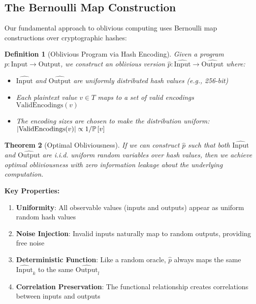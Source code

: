 \documentclass[11pt,final]{article}
\newtheorem{theorem}{Theorem}[section]
\newtheorem{definition}[theorem]{Definition}
\begin{document}
\subsection{The Bernoulli Map Construction}

Our fundamental approach to oblivious computing uses Bernoulli map constructions over cryptographic hashes:

\begin{definition}[Oblivious Program via Hash Encoding]
Given a program $p: \text{Input} \to \text{Output}$, we construct an oblivious version $\hat{p}: \widehat{\text{Input}} \to \widehat{\text{Output}}$ where:
\begin{itemize}
    \item $\widehat{\text{Input}}$ and $\widehat{\text{Output}}$ are uniformly distributed hash values (e.g., 256-bit)
    \item Each plaintext value $v \in T$ maps to a set of valid encodings $\text{ValidEncodings}(v)$
    \item The encoding sizes are chosen to make the distribution uniform: $|\text{ValidEncodings}(v)| \propto 1/\mathbb{P}\left[v\right]$
\end{itemize}
\end{definition}

\begin{theorem}[Optimal Obliviousness]
If we can construct $\hat{p}$ such that both $\widehat{\text{Input}}$ and $\widehat{\text{Output}}$ are i.i.d. uniform random variables over hash values, then we achieve optimal obliviousness with zero information leakage about the underlying computation.
\end{theorem}

\textbf{Key Properties:}
\begin{enumerate}
    \item \textbf{Uniformity}: All observable values (inputs and outputs) appear as uniform random hash values
    \item \textbf{Noise Injection}: Invalid inputs naturally map to random outputs, providing free noise
    \item \textbf{Deterministic Function}: Like a random oracle, $\hat{p}$ always maps the same $\widehat{\text{Input}}_k$ to the same $\widehat{\text{Output}}_l$
    \item \textbf{Correlation Preservation}: The functional relationship creates correlations between inputs and outputs
\end{enumerate}
\end{document}
